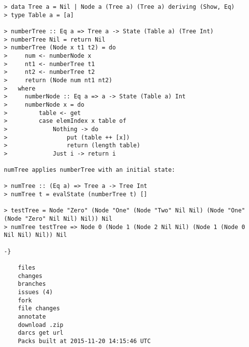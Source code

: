 \begin{multicols}{2}
\begin{lstlisting}
> data Tree a = Nil | Node a (Tree a) (Tree a) deriving (Show, Eq)
> type Table a = [a]

> numberTree :: Eq a => Tree a -> State (Table a) (Tree Int)
> numberTree Nil = return Nil
> numberTree (Node x t1 t2) = do
>     num <- numberNode x
>     nt1 <- numberTree t1
>     nt2 <- numberTree t2
>     return (Node num nt1 nt2)
>   where
>     numberNode :: Eq a => a -> State (Table a) Int
>     numberNode x = do
>         table <- get
>         case elemIndex x table of
>             Nothing -> do
>                 put (table ++ [x])
>                 return (length table)
>             Just i -> return i

numTree applies numberTree with an initial state:

> numTree :: (Eq a) => Tree a -> Tree Int
> numTree t = evalState (numberTree t) []

> testTree = Node "Zero" (Node "One" (Node "Two" Nil Nil) (Node "One" (Node "Zero" Nil Nil) Nil)) Nil
> numTree testTree => Node 0 (Node 1 (Node 2 Nil Nil) (Node 1 (Node 0 Nil Nil) Nil)) Nil

-}

    files
    changes
    branches
    issues (4)
    fork
    file changes
    annotate
    download .zip
    darcs get url
    Packs built at 2015-11-20 14:15:46 UTC
\end{lstlisting}
\end{multicols}
\newpage

